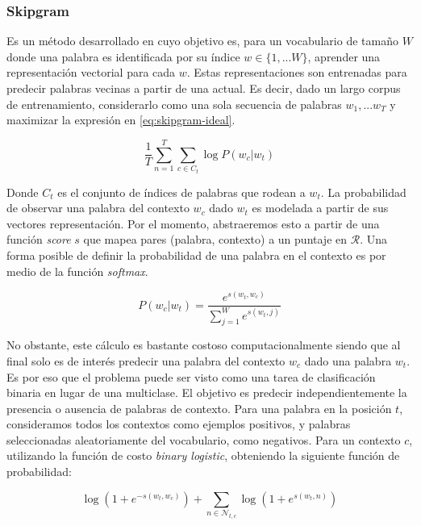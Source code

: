 \subsubsection{Skipgram}

Es un método desarrollado en \citep{Mikolov-2013} cuyo objetivo es, para un
vocabulario de tamaño $W$ donde una palabra es identificada por su índice $w \in
\{1, ... W\}$, aprender una representación vectorial para cada $w$. Estas
representaciones son entrenadas para predecir palabras vecinas a partir de una
actual. Es decir, dado un largo corpus de entrenamiento, considerarlo como una
sola secuencia de palabras $w_1, ... w_T$ y maximizar la expresión en
\ref{eq:skipgram-ideal}.

\begin{equation} \label{eq:skipgram-ideal}
    \frac{1}{T} \sum_{n=1}^{T}
                    \sum_{c \in C_t} \log P(w_c | w_t)
\end{equation}

Donde $C_t$ es el conjunto de índices de palabras que rodean a $w_t$. La
probabilidad de observar una palabra del contexto $w_c$ dado $w_t$ es modelada a
partir de sus vectores representación. Por el momento, abstraeremos esto a
partir de una función \emph{score} $s$ que mapea pares (palabra, contexto) a un
puntaje en $\mathcal{R}$. Una forma posible de definir la probabilidad de una
palabra en el contexto es por medio de la función \emph{softmax}.

\begin{equation} \label{eq:skipram-softmax}
    P(w_{c}|w_{t}) = \frac{e^{s(w_t, w_c)}}{\sum_{j=1}^{W} e^{s(w_t, j)}}
\end{equation}

No obstante, este cálculo es bastante costoso computacionalmente siendo que al
final solo es de interés predecir una palabra del contexto $w_c$ dado una
palabra $w_t$. Es por eso que el problema puede ser visto como una tarea de
clasificación binaria en lugar de una multiclase. El objetivo es predecir
independientemente la presencia o ausencia de palabras de contexto. Para una
palabra en la posición $t$, consideramos todos los contextos como ejemplos
positivos, y palabras seleccionadas aleatoriamente del vocabulario, como
negativos. Para un contexto $c$, utilizando la función de costo \emph{binary
logistic}, obteniendo la siguiente función de probabilidad:

\begin{equation}
    \log\left( 1 + e^{-s(w_t, w_c)} \right) +
    \sum_{n \in \mathcal{N}_{t, c}} \log\left( 1 + e^{s(w_t, n)} \right)
\end{equation}


